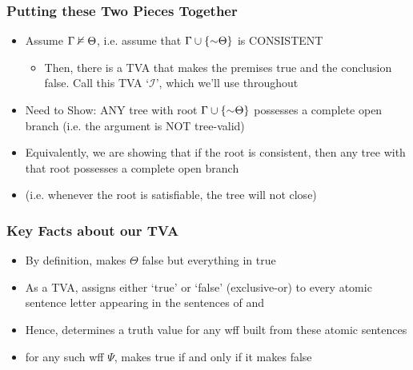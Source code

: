 \begin{frame}
\frametitle{Putting these Two Pieces Together}

\begin{itemize}[<+->]

\item Assume $\Gamma \nvDash \Theta$, i.e. assume that $\Gamma \cup \{\enot \Theta \}$ is \textcolor{OGlyallpink}{CONSISTENT}

\bigskip

\begin{itemize}

\item Then, there is a TVA that makes the premises true and the conclusion false. Call this TVA \; `$\mathcal{I}$', which we'll use throughout

\end{itemize}

\item Need to Show: ANY tree with root $\Gamma \cup \{\enot \Theta \}$ possesses a \textcolor{OGlyallpink}{complete open branch} (i.e. the argument is NOT tree-valid)

\item Equivalently, we are showing that if the root is consistent, then any tree with that root possesses a complete open branch 

\item (i.e. whenever the root is satisfiable, the tree will not close)


\end{itemize}
\end{frame}

\begin{frame}
\frametitle{Key Facts about our TVA }

\begin{itemize}[<+->]

\item By definition,  makes $\Theta$ false but everything in \GA true

\item As a TVA,  assigns either `true' or `false' (exclusive-or) to every atomic sentence letter appearing in the sentences of \GA and \THA

\item Hence,  determines a truth value for any wff built from these atomic sentences

\item for any such wff $\Psi$,  makes \PS true if and only if it makes \enot\PS false

\end{itemize}
\end{frame}

